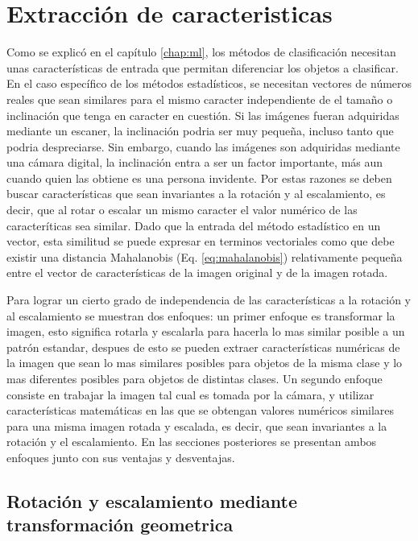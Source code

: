 \documentclass[a4paper, 11pt, oneside]{report}
\begin{document}
\section{Extracción de caracteristicas}

Como se explicó en el capítulo \ref{chap:ml}, los métodos de clasificación necesitan unas características de entrada que permitan diferenciar los objetos a clasificar. En el caso específico de los métodos estadísticos, se necesitan vectores de números reales que sean similares para el mismo caracter independiente de el tamaño o inclinación que tenga en caracter en cuestión. Si las imágenes fueran adquiridas mediante un escaner, la inclinación podria ser muy pequeña, incluso tanto que podria despreciarse. Sin embargo, cuando las imágenes son adquiridas mediante una cámara digital, la inclinación entra a ser un factor importante, más aun cuando quien las obtiene es una persona invidente. Por estas razones se deben buscar características que sean invariantes a la rotación y al escalamiento, es decir, que al rotar o escalar un mismo caracter el valor numérico de las caracteríticas sea similar. Dado que la entrada del método estadístico en un vector, esta similitud se puede expresar en terminos vectoriales como que debe existir una distancia Mahalanobis (Eq. \ref{eq:mahalanobis}) relativamente pequeña entre el vector de características de la imagen original y de la imagen rotada.

Para lograr un cierto grado de independencia de las características a la rotación y al escalamiento se muestran dos enfoques: un primer enfoque es transformar la imagen, esto significa rotarla y escalarla para hacerla lo mas similar posible a un patrón estandar, despues de esto se pueden extraer características numéricas de la imagen que sean lo mas similares posibles para objetos de la misma clase y lo mas diferentes posibles para objetos de distintas clases. Un segundo enfoque consiste en trabajar la imagen tal cual es tomada por la cámara, y utilizar características matemáticas en las que se obtengan valores numéricos similares para una misma imagen rotada y escalada, es decir, que sean invariantes a la rotación y el escalamiento. En las secciones posteriores se presentan ambos enfoques junto con sus ventajas y desventajas.

\subsection{Rotación y escalamiento mediante transformación geometrica}
\label{sect:rotation}
\end{document}
